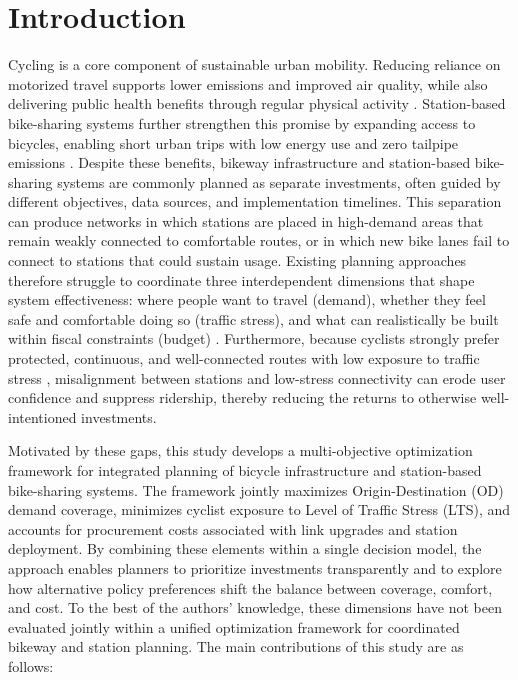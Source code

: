 \documentclass[preprint,authoryear,10pt]{elsarticle}
\begin{document}

\section{Introduction}\label{intro}

Cycling is a core component of sustainable urban mobility. Reducing reliance on motorized travel supports lower emissions and improved air quality, while also delivering public health benefits through regular physical activity \citep{CHEN2022103475, BRAND2021102764}. Station-based bike-sharing systems further strengthen this promise by expanding access to bicycles, enabling short urban trips with low energy use and zero tailpipe emissions \citep{Pucher02112017, MCQUEEN2020102482, JACOBSON200914}. Despite these benefits, bikeway infrastructure and station-based bike-sharing systems are commonly planned as separate investments, often guided by different objectives, data sources, and implementation timelines. This separation can produce networks in which stations are placed in high-demand areas that remain weakly connected to comfortable routes, or in which new bike lanes fail to connect to stations that could sustain usage. Existing planning approaches therefore struggle to coordinate three interdependent dimensions that shape system effectiveness: where people want to travel (demand), whether they feel safe and comfortable doing so (traffic stress), and what can realistically be built within fiscal constraints (budget) \citep{wiedemann2025Bikenetworkplanning, paulsen2023Societallyoptimalexpansion, nateraorozco2020Datadrivenstrategiesoptimal}. Furthermore, because cyclists strongly prefer protected, continuous, and well-connected routes with low exposure to traffic stress \citep{buehler2016BikewayNetworksReview, ta2021impactgreenspace, GRAYSTONE2022103237}, misalignment between stations and low-stress connectivity can erode user confidence and suppress ridership, thereby reducing the returns to otherwise well-intentioned investments.

Motivated by these gaps, this study develops a multi-objective optimization framework for integrated planning of bicycle infrastructure and station-based bike-sharing systems. The framework jointly maximizes Origin-Destination (OD) demand coverage, minimizes cyclist exposure to Level of Traffic Stress (LTS), and accounts for procurement costs associated with link upgrades and station deployment. By combining these elements within a single decision model, the approach enables planners to prioritize investments transparently and to explore how alternative policy preferences shift the balance between coverage, comfort, and cost. To the best of the authors' knowledge, these dimensions have not been evaluated jointly within a unified optimization framework for coordinated bikeway and station planning. The main contributions of this study are as follows:
\end{document}
